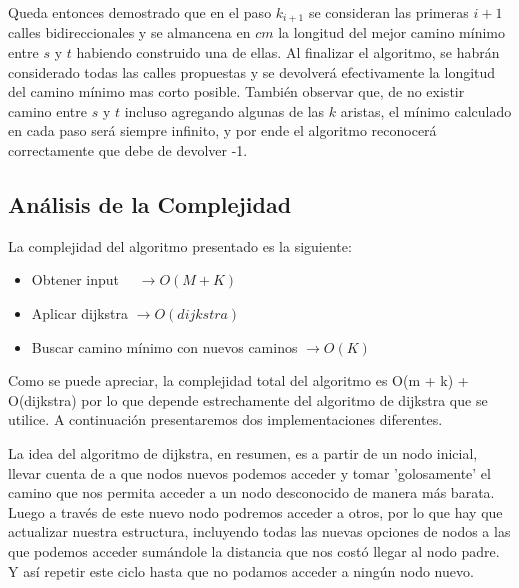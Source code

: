 \vspace{1em}

Queda entonces demostrado que en el paso $k_{i+1}$ se consideran las primeras $i+1$ calles bidireccionales y se almancena en $cm$ la longitud del mejor camino mínimo entre $s$ y $t$ habiendo construido una de ellas. Al finalizar el algoritmo, se habrán considerado todas las calles propuestas y se devolverá efectivamente la longitud del camino mínimo mas corto posible. También observar que, de no existir camino entre $s$ y $t$ incluso agregando algunas de las $k$ aristas, el mínimo calculado en cada paso será siempre infinito, y por ende el algoritmo reconocerá correctamente que debe de devolver -1.

\subsection{Análisis de la Complejidad}
\vspace{1em}

La complejidad del algoritmo presentado es la siguiente: 

\begin{itemize}
    \item Obtener input \qquad \qquad \qquad \qquad \qquad \quad \quad \ \ $\rightarrow O(M + K)$
    \item Aplicar dijkstra \qquad \qquad \qquad \qquad \qquad \qquad $\rightarrow O(dijkstra)$
    \item Buscar camino mínimo con nuevos caminos $\rightarrow O(K)$
\end{itemize}

Como se puede apreciar, la complejidad total del algoritmo es O(m + k) + O(dijkstra) por lo que depende estrechamente del algoritmo de dijkstra que se utilice. A continuación presentaremos dos implementaciones diferentes.

\vspace{1em}

La idea del algoritmo de dijkstra, en resumen, es a partir de un nodo inicial, llevar cuenta de a que nodos nuevos podemos acceder y tomar 'golosamente' el camino que nos permita acceder a un nodo desconocido de manera más barata. Luego a través de este nuevo nodo podremos acceder a otros, por lo que hay que actualizar nuestra estructura, incluyendo todas las nuevas opciones de nodos a las que podemos acceder sumándole la distancia que nos costó llegar al nodo padre. Y así repetir este ciclo hasta que no podamos acceder a ningún nodo nuevo. 

